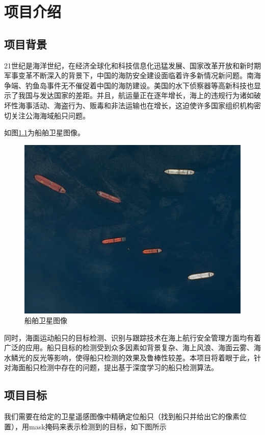 
\chapter{项目介绍}\label{ux9879ux76eeux4ecbux7ecd}

\section{项目背景}\label{ux9879ux76eeux80ccux666f}

21世纪是海洋世纪，在经济全球化和科技信息化迅猛发展、国家改革开放和新时期军事变革不断深入的背景下，中国的海防安全建设面临着许多新情况新问题。南海争端、钓鱼岛事件无不催促着中国的海防建设。美国的水下侦察器等高新科技也显示了我国与发达国家的差距。并且，航运量正在逐年增长，海上的违规行为诸如破坏性海事活动、海盗行为、贩毒和非法运输也在增长，这迫使许多国家组织机构密切关注公海海域船只问题。

如图\ref{fig::EDA1}为船舶卫星图像。

\begin{figure}[htbp]
\centering
\includegraphics[width=0.6\linewidth]{body/EDA_pic/ships_xs}
\caption{船舶卫星图像}
\label{fig::EDA1}
\end{figure}

同时，海面运动船只的目标检测、识别与跟踪技术在海上航行安全管理方面均有着广泛的应用。船只目标的检测受到众多因素如背景复杂、海上风浪、海面云雾、海水鳞光的反光等影响，使得船只检测的效果及鲁棒性较差。本项目将着眼于此，针对海面船只检测中存在的问题，提出基于深度学习的船只检测算法。

\section{项目目标}\label{ux9879ux76eeux76eeux6807}

我们需要在给定的卫星遥感图像中精确定位船只（找到船只并给出它的像素位置），用mask掩码来表示检测到的目标，如下图所示

